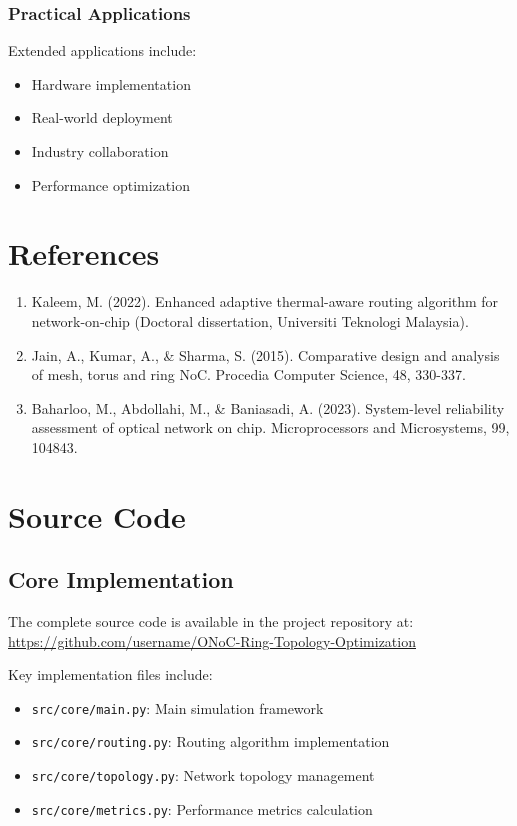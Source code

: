 \documentclass[12pt]{article}
\begin{document}
\subsubsection{Practical Applications}
Extended applications include:
\begin{itemize}[noitemsep]
    \item Hardware implementation
    \item Real-world deployment
    \item Industry collaboration
    \item Performance optimization
\end{itemize}

\clearpage
{}
\section*{References}
\begin{enumerate}
    \item Kaleem, M. (2022). Enhanced adaptive thermal-aware routing algorithm for network-on-chip (Doctoral dissertation, Universiti Teknologi Malaysia).
    \item Jain, A., Kumar, A., \& Sharma, S. (2015). Comparative design and analysis of mesh, torus and ring NoC. Procedia Computer Science, 48, 330-337.
    \item Baharloo, M., Abdollahi, M., \& Baniasadi, A. (2023). System-level reliability assessment of optical network on chip. Microprocessors and Microsystems, 99, 104843.
\end{enumerate}

\clearpage
\appendix
\section{Source Code}
\subsection{Core Implementation}
The complete source code is available in the project repository at:
\url{https://github.com/username/ONoC-Ring-Topology-Optimization}

Key implementation files include:
\begin{itemize}[noitemsep]
    \item \texttt{src/core/main.py}: Main simulation framework
    \item \texttt{src/core/routing.py}: Routing algorithm implementation
    \item \texttt{src/core/topology.py}: Network topology management
    \item \texttt{src/core/metrics.py}: Performance metrics calculation
\end{itemize}
\end{document}
